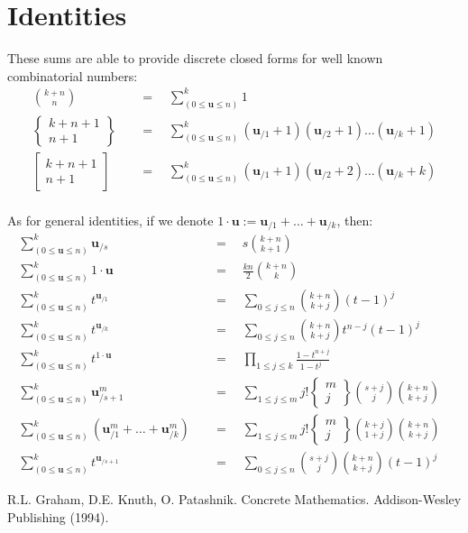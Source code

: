 \documentclass[twoside]{article}
\newcommand{\bu}[1][u]{\ensuremath{\mathbf #1}}
\newcommand{\eq}{\ensuremath{\quad=\quad}}
\begin{document}
\section{Identities}

These sums are able to provide discrete closed forms for well known combinatorial numbers:
\begin{align*}
{k+n\choose n}
 &\eq \sum_{(0\le\bu\le n)}^k \!\!\! 1						\\
\left\{\!\!\!\begin{array}{c} k+n+1 \\ n+1 \end{array}\!\!\!\right\}
 &\eq \sum_{(0\le\bu\le n)}^k \!\!\!\!
	(\bu_{/1}+1)(\bu_{/2}+1)\ldots(\bu_{/k}+1)				\\
\left[\!\!\!\begin{array}{c} k+n+1 \\ n+1 \end{array}\!\!\!\right]   
 &\eq \sum_{(0\le\bu\le n)}^k \!\!\!\!
	(\bu_{/1}+1)(\bu_{/2}+2)\ldots(\bu_{/k}+k)				\\
\end{align*}

As for general identities, if we denote $ 1\cdot\bu := \bu_{/1} + \ldots + \bu_{/k} $, then:
\begin{align*}
\sum_{(0\le\bu\le n)}^k\!\!\!\!\! \bu_{\!/s}
 &\eq s{k+n\choose k+1}                                                    \\
\sum_{(0\le\bu\le n)}^k\!\!\!\!\! 1\cdot\bu  
 &\eq \frac{kn}{2} {k+n\choose k}                                          \\ 
\sum_{(0\le\bu\le n)}^k\!\!\!\!\! t^{\bu_{\!/1}} 
 &\eq \sum_{0\le j\le n}{k+n\choose k+j}(t-1)^j                            \\
\sum_{(0\le\bu\le n)}^k\!\!\!\!\! t^{\bu_{\!/k}} 
 &\eq \sum_{0\le j\le n}{k+n\choose k+j}t^{n-j}(t-1)^j                     \\
\sum_{(0\le\bu\le n)}^k\!\!\!\!\! t^{1\cdot\bu}           
 &\eq \prod_{1\le j\le k}\frac{1-t^{n+j}}{1-t^{j\ \ \ }}                   
 &									   \\
\sum_{(0\le\bu\le n)}^k\!\!\!\!\! \bu_{\!/s+1}^m 
 &\eq \sum_{1\le j\le m}j!\left\{\!\!\!\begin{array}{c} m \\ j 
       \end{array}\!\!\!\right\}{s+j\choose j}{k+n\choose k+j}              \\
\sum_{(0\le\bu\le n)}^k\!\!\!\!\! (\bu_{\!/1}^m+\ldots +\bu_{\!/k}^m)
 &\eq \sum_{1\le j\le m}j!\left\{\!\!\!\begin{array}{c} m \\ j 
       \end{array}\!\!\!\right\}{k+j\choose 1+j}{k+n\choose k+j}            \\
\sum_{(0\le\bu\le n)}^k\!\!\!\!\! t^{\bu_{\!/s+1}}
 &\eq \sum_{0\le j\le n}{s+j\choose j}{k+n\choose k+j}(t-1)^j                
\end{align*} 

\begin{thebibliography}{99}
 R.L. Graham, D.E. Knuth, O. Patashnik.  Concrete
         Mathematics.  Addison-Wesley Publishing (1994).
\end{thebibliography}
\end{document}
